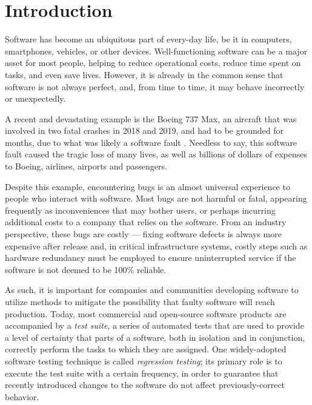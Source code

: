 \chapter{Introduction}\label{chap:intro}

Software has become an ubiquitous part of every-day life, be it in computers, smartphones, vehicles, or other devices.
Well-functioning software can be a major asset for most people, helping to reduce operational costs, reduce time spent on tasks, and even save lives.
However, it is already in the common sense that software is not always perfect, and, from time to time, it may behave incorrectly or unexpectedly.

A recent and devastating example is the Boeing 737 Max, an aircraft that was involved in two fatal crashes in 2018 and 2019, and had to be grounded for months, due to what was likely a software fault \cite{levin_latest_2019}.
Needless to say, this software fault caused the tragic loss of many lives, as well as billions of dollars of expenses to Boeing, airlines, airports and passengers.

Despite this example, encountering bugs is an almost universal experience to people who interact with software.
Most bugs are not harmful or fatal, appearing frequently as inconveniences that may bother users, or perhaps incurring additional costs to a company that relies on the software.
From an industry perspective, these bugs are costly — fixing software defects is always more expensive after release and, in critical infrastructure systems, costly steps such as hardware redundancy must be employed to ensure uninterrupted service if the software is not deemed to be 100\% reliable.

As such, it is important for companies and communities developing software to utilize methods to mitigate the possibility that faulty software will reach production.
Today, most commercial and open-source software products are accompanied by a \textit{test suite}, a series of automated tests that are used to provide a level of certainty that parts of a software, both in isolation and in conjunction, correctly perform the tasks to which they are assigned.
One widely-adopted software testing technique is called \textit{regression testing}; its primary role is to execute the test suite with a certain frequency, in order to guarantee that recently introduced changes to the software do not affect previously-correct behavior.

